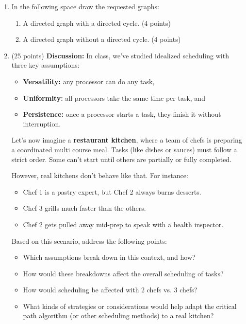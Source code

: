 \documentclass[12pt]{exam}
\begin{document}
\begin{enumerate}
\item In the following space draw the requested graphs:
\begin{enumerate}
    \item A directed graph with a directed cycle. (4 points)
    \vspace{3.5cm}
    \item A directed graph without a directed cycle. (4 points)
    \vfill
\end{enumerate}

\newpage
\item (25 points) \textbf{Discussion:} In class, we've studied idealized scheduling with three key assumptions:  
\begin{itemize}
    \item \textbf{Versatility:} any processor can do any task,
    \item \textbf{Uniformity:} all processors take the same time per task, and
    \item \textbf{Persistence:} once a processor starts a task, they finish it without interruption.
\end{itemize}

Let's now imagine a \textbf{restaurant kitchen}, where a team of chefs is preparing a coordinated multi course meal. Tasks (like dishes or sauces) must follow a strict order. Some can't start until others are partially or fully completed.

However, real kitchens don't behave like that. For instance:
\begin{itemize}
    \item Chef 1 is a pastry expert, but Chef 2 always burns desserts.
    \item Chef 3 grills much faster than the others.
    \item Chef 2 gets pulled away mid-prep to speak with a health inspector.
\end{itemize}

Based on this scenario, address the following points:
\begin{itemize}
    \item Which assumptions break down in this context, and how?
    \item How would these breakdowns affect the overall scheduling of tasks?
    \item How would scheduling be affected with 2 chefs vs. 3 chefs?
    \item What kinds of strategies or considerations would help adapt the critical path algorithm (or other scheduling methods) to a real kitchen?
\end{itemize}


\end{enumerate}
\end{document}
